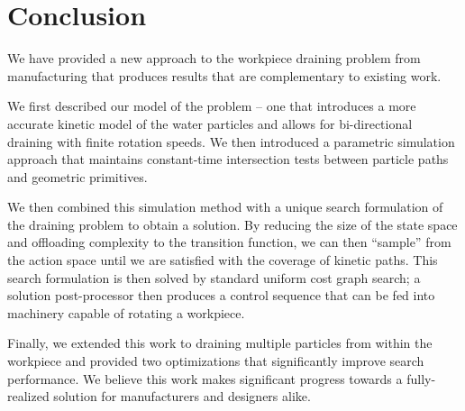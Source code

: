 						\chapter{Conclusion}

We have provided a new approach to the workpiece draining problem from manufacturing that produces results that are complementary to existing work.

We first described our model of the problem -- one that introduces a more accurate kinetic model of the water particles and allows for bi-directional draining with finite rotation speeds. We then introduced a parametric simulation approach that maintains constant-time intersection tests between particle paths and geometric primitives.

We then combined this simulation method with a unique search formulation of the draining problem to obtain a solution. By reducing the size of the state space and offloading complexity to the transition function, we can then ``sample'' from the action space until we are satisfied with the coverage of kinetic paths. This search formulation is then solved by standard uniform cost graph search; a solution post-processor then produces a control sequence that can be fed into machinery capable of rotating a workpiece.

Finally, we extended this work to draining multiple particles from within the workpiece and provided two optimizations that significantly improve search performance. We believe this work makes significant progress towards a fully-realized solution for manufacturers and designers alike.

